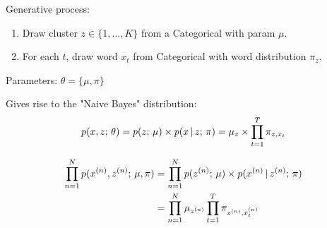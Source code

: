 \begin{frame}

\vspace{0.25cm}

Generative process: 
\begin{enumerate}
\item Draw cluster $z \in \{1, \ldots, K\}$ from a Categorical with param $\mu$.
\item For each $t$, draw word $x_t$ from Categorical with word distribution $\pi_{z}$.
\end{enumerate}
\air
Parameters: $\theta = \{\mu, \pi\}$

\air



Gives rise to the "Naive Bayes" distribution:
\begin{align*}
     p(x, z ; \, \theta) = p(z ; \, \mu) \times p(x \,|\, z ; \, \pi) = \mu_{z} \times  \prod_{t=1}^T \pi_{z, x_t}
\end{align*}
\end{frame}


\begin{frame}

\begin{center}

\end{center}

\air
\air

\begin{align*}
     \prod_{n=1}^N p(x^{(n)}, z^{(n)} ; \, \mu, \pi) &= \prod_{n=1}^N p(z^{(n)} ; \, \mu) \times p(x^{(n)} \,|\, z^{(n)} ; \, \pi) \\
     &= \prod_{n=1}^N \mu_{z^{(n)}}   \prod_{t=1}^T \pi_{z^{(n)},  x^{(n)}_t}
\end{align*}
\end{frame}





